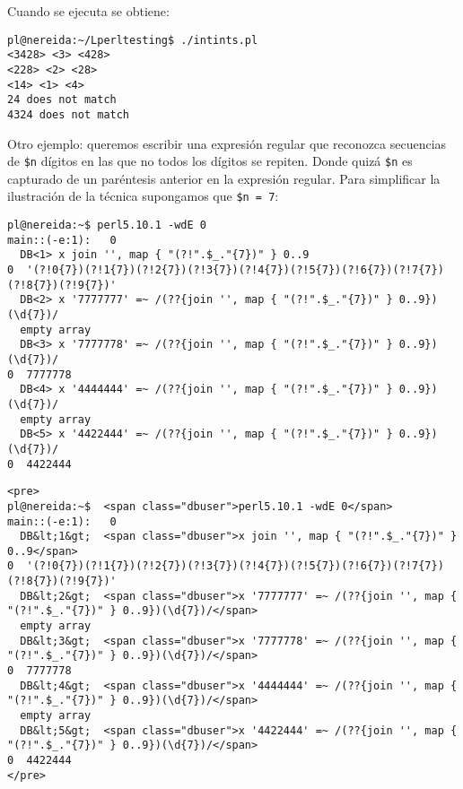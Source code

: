 \begin{verbatim}
\end{verbatim}%

Cuando se ejecuta se obtiene:
\begin{verbatim}
pl@nereida:~/Lperltesting$ ./intints.pl
<3428> <3> <428>
<228> <2> <28>
<14> <1> <4>
24 does not match
4324 does not match
\end{verbatim}


Otro ejemplo: queremos escribir una expresión regular que reconozca secuencias
de  \verb|$n| dígitos en las que no todos los dígitos se repiten. Donde quizá \verb|$n| es capturado
de un paréntesis anterior en la expresión regular. Para simplificar la ilustración
de la técnica supongamos que \verb|$n = 7|:
\begin{latexonly}
\begin{verbatim}
pl@nereida:~$ perl5.10.1 -wdE 0
main::(-e:1):   0
  DB<1> x join '', map { "(?!".$_."{7})" } 0..9
0  '(?!0{7})(?!1{7})(?!2{7})(?!3{7})(?!4{7})(?!5{7})(?!6{7})(?!7{7})(?!8{7})(?!9{7})'
  DB<2> x '7777777' =~ /(??{join '', map { "(?!".$_."{7})" } 0..9})(\d{7})/
  empty array
  DB<3> x '7777778' =~ /(??{join '', map { "(?!".$_."{7})" } 0..9})(\d{7})/
0  7777778
  DB<4> x '4444444' =~ /(??{join '', map { "(?!".$_."{7})" } 0..9})(\d{7})/
  empty array
  DB<5> x '4422444' =~ /(??{join '', map { "(?!".$_."{7})" } 0..9})(\d{7})/
0  4422444
\end{verbatim}
\end{latexonly}
\begin{verbatim}
<pre>
pl@nereida:~$  <span class="dbuser">perl5.10.1 -wdE 0</span>
main::(-e:1):   0
  DB&lt;1&gt;  <span class="dbuser">x join '', map { "(?!".$_."{7})" } 0..9</span>
0  '(?!0{7})(?!1{7})(?!2{7})(?!3{7})(?!4{7})(?!5{7})(?!6{7})(?!7{7})(?!8{7})(?!9{7})'
  DB&lt;2&gt;  <span class="dbuser">x '7777777' =~ /(??{join '', map { "(?!".$_."{7})" } 0..9})(\d{7})/</span>
  empty array
  DB&lt;3&gt;  <span class="dbuser">x '7777778' =~ /(??{join '', map { "(?!".$_."{7})" } 0..9})(\d{7})/</span>
0  7777778
  DB&lt;4&gt;  <span class="dbuser">x '4444444' =~ /(??{join '', map { "(?!".$_."{7})" } 0..9})(\d{7})/</span>
  empty array
  DB&lt;5&gt;  <span class="dbuser">x '4422444' =~ /(??{join '', map { "(?!".$_."{7})" } 0..9})(\d{7})/</span>
0  4422444
</pre>
\end{verbatim}

\label{parrafo:palindromospostregexp}

